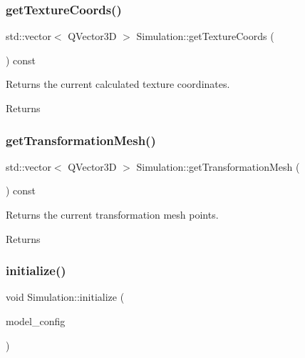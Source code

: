 \subsubsection{\texorpdfstring{get\+Texture\+Coords()}{getTextureCoords()}}
{\footnotesize\ttfamily std\+::vector$<$ Q\+Vector3D $>$ Simulation\+::get\+Texture\+Coords (\begin{DoxyParamCaption}{ }\end{DoxyParamCaption}) const}



Returns the current calculated texture coordinates. 

\begin{DoxyReturn}{Returns}

\end{DoxyReturn}
\mbox{\label{class_simulation_a51325a28f5c8d5e37cb8d90fb6f79634}} 
\subsubsection{\texorpdfstring{get\+Transformation\+Mesh()}{getTransformationMesh()}}
{\footnotesize\ttfamily std\+::vector$<$ Q\+Vector3D $>$ Simulation\+::get\+Transformation\+Mesh (\begin{DoxyParamCaption}{ }\end{DoxyParamCaption}) const}



Returns the current transformation mesh points. 

\begin{DoxyReturn}{Returns}

\end{DoxyReturn}
\mbox{\label{class_simulation_a9cb0aae7c447fd77c0dd7900e925e03e}} 
\subsubsection{\texorpdfstring{initialize()}{initialize()}}
{\footnotesize\ttfamily void Simulation\+::initialize (\begin{DoxyParamCaption}\item[{\mbox{\hyperlink{struct_model_config}{Model\+Config}} $\ast$}]{model\+\_\+config }\end{DoxyParamCaption})}



